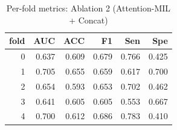 \begin{table}[H]
\centering
\small
\caption{Per-fold metrics: Ablation 2 (Attention-MIL + Concat)}
\label{tab:ablation2_attention_mil_concat_per_fold}
\begin{tabular}{rrrrrr}
\toprule
fold & AUC & ACC & F1 & Sen & Spe \\
\midrule
0 & 0.637 & 0.609 & 0.679 & 0.766 & 0.425 \\
1 & 0.705 & 0.655 & 0.659 & 0.617 & 0.700 \\
2 & 0.654 & 0.593 & 0.653 & 0.702 & 0.462 \\
3 & 0.641 & 0.605 & 0.605 & 0.553 & 0.667 \\
4 & 0.700 & 0.612 & 0.686 & 0.783 & 0.410 \\
\bottomrule
\end{tabular}
\end{table}
